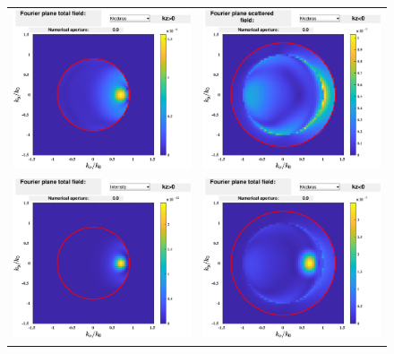 \begin{figure}[H]
\begin{center}
\begin{tabular}{cc}
  \includegraphics*[width=7.0cm,draft=false]{test2fourierpos.eps}
&  \includegraphics*[width=7.0cm,draft=false]{test2fourierneg.eps} \\
\includegraphics*[width=7.0cm,draft=false]{test2fourierincpos.eps}
&  \includegraphics*[width=7.0cm,draft=false]{test2fourierincneg.eps}
\end{tabular}


\end{center}
\end{figure}
